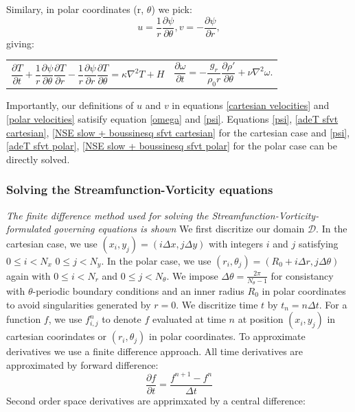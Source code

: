\documentclass{article}
\begin{document}
Similary, in polar coordinates (r, $\theta$) we pick:
\begin{equation}
	u = \frac{1}{r} \frac{\partial \psi}{\partial \theta}, v = -\frac{\partial \psi}{\partial r},
	\label{polar velocities}
\end{equation}
giving:

\begin{tabularx}{\textwidth}{XX}
\begin{equation}
	\frac{\partial T}{\partial t} + \frac{1}{r} \frac{\partial \psi}{\partial \theta} \frac{\partial T}{\partial r} - \frac{1}{r} \frac{\partial \psi}{\partial r} \frac{\partial T}{\partial \theta} = \kappa \nabla^2 T + H
	\label{adeT sfvt polar}
\end{equation}
    &
\begin{equation}
	\frac{\partial \omega}{\partial t} = - \frac{g_r}{\rho_0 r} \frac{\partial \rho'}{\partial \theta} +\nu \nabla^2 \omega.
	\label{NSE slow + boussinesq sfvt polar}
\end{equation}
\end{tabularx}\par
Importantly, our definitions of $u$ and $v$ in equations \ref{cartesian velocities} and \ref{polar velocities} satisify equation \ref{omega} and \ref{psi}. Equations \ref{psi}, \ref{adeT sfvt cartesian}, \ref{NSE slow + boussinesq sfvt cartesian} for the cartesian case and \ref{psi}, \ref{adeT sfvt polar}, \ref{NSE slow + boussinesq sfvt polar} for the polar case can be directly solved.

\subsubsection*{Solving the Streamfunction-Vorticity equations}
{\it{The finite difference method used for solving the Streamfunction-Vorticity-formulated governing equations is shown}}
\vspace{0.3cm}
\newline
\noindent We first discritize our domain $\mathcal{D}$. In the cartesian case, we use $(x_i,y_j)=(i \Delta x, j \Delta y)
$ with integers $i$ and $j$ satisfying $0\leq i < N_x$ $0 \leq j < N_y$. In the polar case, we use $(r_i, \theta_j)= (R_0 
+ i \Delta r, j 
\Delta \theta)$ again with  $0 \leq i < N_r$ and $0 \leq j < N_{\theta}$. We impose $\Delta \theta = \frac{2 \pi}
{N_{\theta} - 1}$ for consistancy with $\theta$-periodic boundary conditions and an inner radius $R_0$ in polar 
coordinates to avoid 
singularities generated by $r=0$. We discritize time $t$ by $t_n = n \Delta t$. For a function $f$, we use 
$f^n_{i,j}$ to denote $f$ evaluated at time $n$ at position $(x_i,y_j)$ in cartesian coorindates or $(r_i, \theta_j)$ in 
polar coordinates. 
\newline
To approximate derivatives we use a finite difference approach. All time derivatives are approximated by forward difference:
\begin{equation}
	\frac{\partial f}{\partial t} = \frac{f^{n+1} - f^{n}}{\Delta t}
	\label{forward time difference}
\end{equation}
Second order space derivatives are apprimxated by a central difference:
\end{document}
